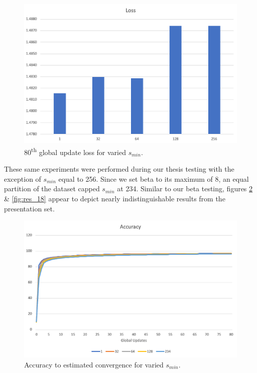 \documentclass[../mthe-493-final-project.tex]{subfiles}
\begin{document}
    \begin{figure}
        \centering
        \includegraphics[width=150mm]{thesis/img/res_16.png}
        \caption{80\textsuperscript{th} global update loss for varied $s_{min}$.}
        \label{fig:res_16}
    \end{figure}
    These same experiments were performed during our thesis testing with the exception of $s_{min}$ equal to 256. Since we set beta to its maximum of 8, an equal partition of the dataset capped $s_{min}$ at 234. Similar to our beta testing, figures \ref{fig:res_17} \& \ref{fig:res_18} appear to depict nearly indistinguishable results from the presentation set. 
    \begin{figure}
        \centering
        \includegraphics[width=140mm]{thesis/img/res_17.png}
        \caption{Accuracy to estimated convergence for varied $s_{min}$.}
        \label{fig:res_17}
    \end{figure}
\end{document}
